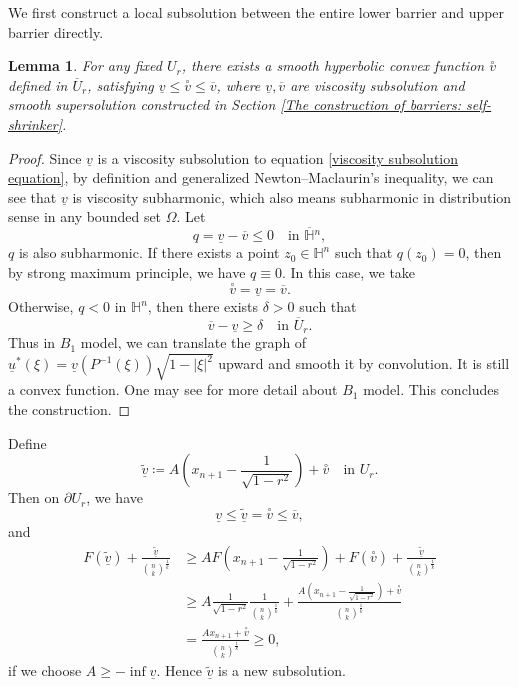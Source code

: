 \documentclass[reqno]{amsart}
\newtheorem{lemma}[theorem]{Lemma}
\theoremstyle{remark}
\theoremstyle{definition}
\numberwithin{equation}{section}
\begin{document}
We first construct a local subsolution between the entire lower barrier and upper barrier directly.
\begin{lemma}
    For any fixed $U_r$, there exists a smooth hyperbolic convex function $\overset{\circ}{v}$ defined in $\overline{U}_r$, satisfying $\underline{v} \leqslant \overset{\circ}{v} \leqslant \overline{v}$, where $\underline{v},\overline{v}$ are viscosity  subsolution and smooth supersolution constructed in Section \ref{The construction of barriers: self-shrinker}.  
\end{lemma}
\begin{proof}
    Since $\underline{v}$ is a viscosity subsolution to equation \eqref{viscosity subsolution equation}, by definition and generalized Newton--Maclaurin's inequality, we can see that $\underline{v}$ is viscosity subharmonic, which also means subharmonic in distribution sense in any bounded set $\Omega$. Let 
    \[
    q = \underline{v} - \overline{v} \leqslant 0 \quad \text{in } \overline{\mathbb{H}}{}^n,
    \]
    $q$ is also subharmonic. If there exists a point $z_0 \in \mathbb{H}^n$ such that $q(z_0) = 0$, then by strong maximum principle, we have $q \equiv 0$. In this case, we take 
    \[
    \overset{\circ}{v} = \underline{v} = \overline{v}.
    \]
    Otherwise, $q<0$ in $\mathbb{H}^n$, then there exists $\delta>0$ such that
    \[
    \overline{v} - \underline{v} \geqslant \delta \quad \text{in } \overline{U}_r.
    \]
    Thus in $B_1$ model, we can translate the graph of $\underline{u}^*(\xi)=\underline{v}(P^{-1}(\xi))\sqrt{1-|\xi|^2}$ upward and smooth it by convolution. It is still a convex function. One may see \cite{Entireconstantsigmak} for more detail about $B_1$ model. This concludes the construction.
\end{proof}

Define 
\[
\tilde{\underline{v}} \coloneqq A\left(x_{n+1} - \frac{1}{\sqrt{1-r^2}}\right) + \overset{\circ}{v} \quad \text{in } U_r.
\]
Then on $\partial U_r$, we have
\[
\underline{v} \leqslant \tilde{\underline{v}} = \overset{\circ}{v} \leqslant \overline{v},
\]
and 
\begin{align*}
    F(\tilde{\underline{v}}) + \frac{\tilde{\underline{v}}}{\binom{n}{k}^{\frac{1}{k}}} &\geqslant A F(x_{n+1} - \frac{1}{\sqrt{1-r^2}}) + F(\overset{\circ}{v}) + \frac{\tilde{\underline{v}}}{\binom{n}{k}^{\frac{1}{k}}} \\
    &\geqslant A\frac{1}{\sqrt{1-r^2}}\frac{1}{\binom{n}{k}^{\frac{1}{k}}} + \frac{A(x_{n+1} - \frac{1}{\sqrt{1-r^2}}) + \overset{\circ}{v}}{\binom{n}{k}^{\frac{1}{k}}} \\
    &= \frac{Ax_{n+1} + \overset{\circ}{v}}{\binom{n}{k}^{\frac{1}{k}}} \geqslant 0,
\end{align*}
if we choose $A \geqslant -\inf \underline{v}$. Hence $\tilde{\underline{v}}$ is a new subsolution.
\end{document}
